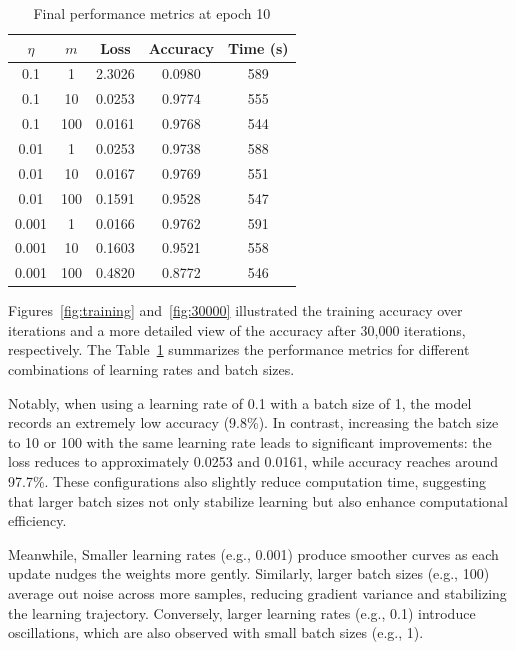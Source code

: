 \begin{table}
    \centering
    \begin{tabular}{|c|c|c|c|c|}
        \hline
        \textbf{\(\eta\)} & \textbf{\(m\)} & \textbf{Loss} & \textbf{Accuracy} & \textbf{Time (s)} \\
        \hline
        0.1   & 1   & 2.3026 & 0.0980  & 589 \\
        0.1   & 10  & 0.0253 & 0.9774  & 555 \\
        0.1   & 100 & 0.0161 & 0.9768  & 544 \\
        0.01  & 1   & 0.0253 & 0.9738  & 588 \\
        0.01  & 10  & 0.0167 & 0.9769  & 551 \\
        0.01  & 100 & 0.1591 & 0.9528  & 547 \\
        0.001 & 1   & 0.0166 & 0.9762  & 591 \\
        0.001 & 10  & 0.1603 & 0.9521  & 558 \\
        0.001 & 100 & 0.4820 & 0.8772  & 546 \\
        \hline
    \end{tabular}
    \caption{Final performance metrics at epoch 10}
    \label{tab:learning_rate_batch_size}
\end{table}

Figures~\ref{fig:training} and~\ref{fig:30000} illustrated the training accuracy over iterations and a more detailed view of the accuracy after 30,000 iterations, respectively. The Table~\ref{tab:learning_rate_batch_size} summarizes the performance metrics for different combinations of learning rates and batch sizes.

Notably, when using a learning rate of 0.1 with a batch size of 1, the model records an extremely low accuracy (9.8\%). In contrast, increasing the batch size to 10 or 100 with the same learning rate leads to significant improvements: the loss reduces to approximately 0.0253 and 0.0161, while accuracy reaches around 97.7\%. These configurations also slightly reduce computation time, suggesting that larger batch sizes not only stabilize learning but also enhance computational efficiency.

Meanwhile, Smaller learning rates (e.g., 0.001) produce smoother curves as each update nudges the weights more gently. Similarly, larger batch sizes (e.g., 100) average out noise across more samples, reducing gradient variance and stabilizing the learning trajectory. Conversely, larger learning rates (e.g., 0.1) introduce oscillations, which are also observed with small batch sizes (e.g., 1).

